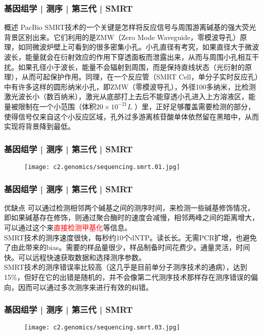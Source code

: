 \begin{frame}
  \frametitle{基因组学 | 测序 | 第三代 | SMRT}
  \begin{block}{概述}
    PacBio SMRT技术的一个关键是怎样将反应信号与周围游离碱基的强大荧光背景区别出来。它们利用的是ZMW（Zero Mode Waveguide，零模波导孔）原理，如同微波炉壁上可看到的很多密集小孔。小孔直径有考究，如果直径大于微波波长，能量就会在衍射效应的作用下穿透面板而泄露出来，从而与周围小孔相互干扰。如果孔径小于波长，能量不会辐射到周围，而是保持直线状态（光衍射的原理），从而可起保护作用。同理，在一个反应管（SMRT Cell，单分子实时反应孔）中有许多这样的圆形纳米小孔，即ZMW（零模波导孔），外径100多纳米，比检测激光波长小（数百纳米），激光从底部打上去后不能穿透小孔进入上方溶液区，能量被限制在一个小范围（体积$20 \times 10^{-21}L$ ）里，正好足够覆盖需要检测的部分，使得信号仅来自这个小反应区域，孔外过多游离核苷酸单体依然留在黑暗中，从而实现将背景降到最低。
  \end{block}
\end{frame}

\begin{frame}
  \frametitle{基因组学 | 测序 | 第三代 | SMRT}
  \begin{figure}
    \centering
    \texttt{[image: c2.genomics/sequencing.smrt.01.jpg]}
  \end{figure}
\end{frame}

\begin{frame}
  \frametitle{基因组学 | 测序 | 第三代 | SMRT}
  \begin{block}{优缺点}
可以通过检测相邻两个碱基之间的测序时间，来检测一些碱基修饰情况，即如果碱基存在修饰，则通过聚合酶时的速度会减慢，相邻两峰之间的距离增大，可以通过这个来\textcolor{red}{直接检测甲基化}等信息。\\
\vspace{1em}
SMRT技术的测序速度很快，每秒约10个dNTP。读长长。无需PCR扩增，也避免了由此带来的bias。需要的样品量很少，样品制备时间花费少。通量灵活，时间快。可以远程快速获取数据和选择测序参数。\\
\vspace{1em}
SMRT技术的测序错误率比较高（这几乎是目前单分子测序技术的通病），达到15\%，但好在它的出错是随机的，并不会像第二代测序技术那样存在测序错误的偏向，因而可以通过多次测序来进行有效的纠错。
  \end{block}
\end{frame}

\begin{frame}
  \frametitle{基因组学 | 测序 | 第三代 | SMRT}
  \begin{figure}
    \centering
    \texttt{[image: c2.genomics/sequencing.smrt.03.jpg]}
  \end{figure}
\end{frame}

